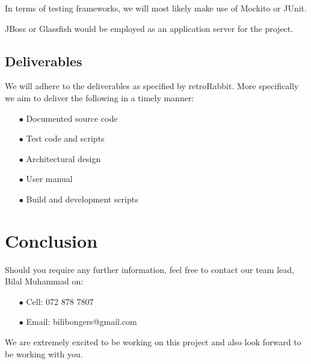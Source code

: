 \documentclass[a4paper,12pt]{article}
\begin{document}
	{\noindent}In terms of testing frameworks, we will most likely make use of Mockito or JUnit.
	
	{\noindent}JBoss or Glassfish would be employed as an application server for the project.
	\newpage
	\subsection{Deliverables}
	We will adhere to the deliverables as specified by retroRabbit. More specifically we aim to deliver the following in a timely manner:
	
		\begin{itemize}
			\item[$\bullet$]Documented source code
			\item[$\bullet$]Test code and scripts
			\item[$\bullet$]Architectural design
			\item[$\bullet$]User manual
			\item[$\bullet$]Build and development scripts
		\end{itemize}
	
	\newpage
	\section{Conclusion}
	
	Should you require any further information, feel free to contact our team lead, Bilal Muhammad on:
	
	\begin{itemize}
		\item[$\bullet$]Cell: 072 878 7807
		\item[$\bullet$]Email: bilibongers@gmail.com
	\end{itemize}
	We are extremely excited to be working on this project and also look forward to be working with you.
	
	
\end{document}
